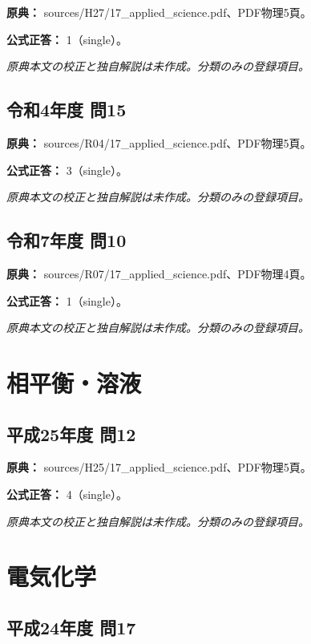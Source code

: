 \noindent\textbf{原典：} sources/H27/17\_applied\_science.pdf、PDF物理5頁。

\textbf{公式正答：} 1（single）。

\par\textit{原典本文の校正と独自解説は未作成。分類のみの登録項目。}

\subsection{令和4年度 問15}
\label{q:r04-reg-applied-15}

\noindent\textbf{原典：} sources/R04/17\_applied\_science.pdf、PDF物理5頁。

\textbf{公式正答：} 3（single）。

\par\textit{原典本文の校正と独自解説は未作成。分類のみの登録項目。}

\subsection{令和7年度 問10}
\label{q:r07-reg-applied-10}

\noindent\textbf{原典：} sources/R07/17\_applied\_science.pdf、PDF物理4頁。

\textbf{公式正答：} 1（single）。

\par\textit{原典本文の校正と独自解説は未作成。分類のみの登録項目。}

\section{相平衡・溶液}

\subsection{平成25年度 問12}
\label{q:h25-reg-applied-12}

\noindent\textbf{原典：} sources/H25/17\_applied\_science.pdf、PDF物理5頁。

\textbf{公式正答：} 4（single）。

\par\textit{原典本文の校正と独自解説は未作成。分類のみの登録項目。}

\section{電気化学}

\subsection{平成24年度 問17}
\label{q:h24-reg-applied-17}

